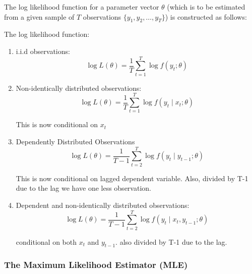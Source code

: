 \documentclass[11pt]{article}
\begin{document}
The log likelihood function for a parameter vector $\theta$ (which is to be estimated from a given sample of $T$ observations $\{y_1, y_2, \ldots, y_T\}$) is constructed as follows:

\begin{definition}
        The log likelihood function:
        \begin{enumerate}
            \item i.i.d observations:
            \begin{equation}
                \log L(\theta)=\frac{1}{T} \sum_{t=1}^T \log f\left(y_t ; \theta\right)
            \end{equation}
            \item Non-identically distributed observations:
            \begin{equation}
                \log L(\theta)=\frac{1}{T} \sum_{t=1}^T \log f\left(y_t \mid x_t ; \theta\right)
            \end{equation}
            \begin{note}
                This is now conditional on $x_t$
            \end{note}
            \item Dependently Distributed Observations
            \begin{equation}
                \log L(\theta)=\frac{1}{T-1} \sum_{t=2}^T \log f\left(y_t \mid y_{t-1} ; \theta\right)
            \end{equation}
            \begin{note}
                This is now conditional on lagged dependent variable. Also, divided by T-1 due to the lag we have one less observation.
            \end{note}
            \item Dependent and non-identically distributed observations:
            \begin{equation}
                \log L(\theta)=\frac{1}{T-1} \sum_{t=2}^T \log f\left(y_t \mid x_t, y_{t-1} ; \theta\right)
            \end{equation}
            \begin{note}
                conditional on both $x_t$ and $y_{t-1}$. also divided by T-1 due to the lag.
            \end{note}
        \end{enumerate}
\end{definition}

\subsubsection{The Maximum Likelihood Estimator (MLE)}
\end{document}

